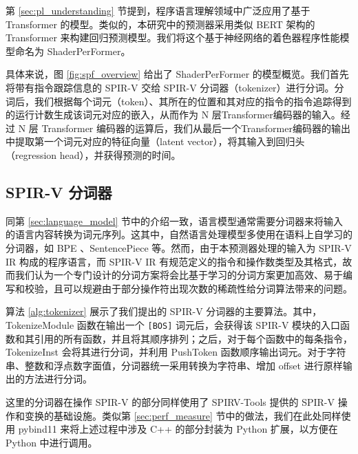 \label{sec:model}


第 \ref{sec:pl_understanding} 节提到，程序语言理解领域中广泛应用了基于 Transformer 的模型。类似的，本研究中的预测器采用类似 BERT\cite{devlin-etal-2019-bert} 架构的 Transformer 来构建回归预测模型。我们将这个基于神经网络的着色器程序性能模型命名为 ShaderPerFormer。

具体来说，图 \ref{fig:spf_overview} 给出了 ShaderPerFormer 的模型概览。我们首先将带有指令跟踪信息的 SPIR-V 交给 SPIR-V 分词器（tokenizer）进行分词。分词后，我们根据每个词元（token）、其所在的位置和其对应的指令的指令追踪得到的运行计数生成该词元对应的嵌入，从而作为 N 层Transformer编码器的输入。经过 N 层 Transformer 编码器的运算后，我们从最后一个Transformer编码器的输出中提取第一个词元对应的特征向量（latent vector），将其输入到回归头（regression head），并获得预测的时间。

\subsection{SPIR-V 分词器}

同第 \ref{sec:language_model} 节中的介绍一致，语言模型通常需要分词器来将输入的语言内容转换为词元序列。这其中，自然语言处理模型多使用在语料上自学习的分词器，如 BPE \cite{sennrich-etal-2016-neural}、SentencePiece \cite{kudo-richardson-2018-sentencepiece} 等。然而，由于本预测器处理的输入为 SPIR-V IR 构成的程序语言，而 SPIR-V IR 有规范定义的指令和操作数类型及其格式，故而我们认为一个专门设计的分词方案将会比基于学习的分词方案更加高效、易于编写和校验，且可以规避由于部分操作符出现次数的稀疏性给分词算法带来的问题。

算法 \ref{alg:tokenizer} 展示了我们提出的 SPIR-V 分词器的主要算法。其中，TokenizeModule 函数在输出一个 \verb|[BOS]| 词元后，会获得该 SPIR-V 模块的入口函数和其引用的所有函数，并且将其顺序排列；之后，对于每个函数中的每条指令，TokenizeInst 会将其进行分词，并利用 PushToken 函数顺序输出词元。对于字符串、整数和浮点数字面值，分词器统一采用转换为字符串、增加 offset 进行原样输出的方法进行分词。

这里的分词器在操作 SPIR-V 的部分同样使用了 SPIRV-Tools 提供的 SPIR-V 操作和变换的基础设施。类似第 \ref{sec:perf_measure} 节中的做法，我们在此处同样使用 pybind11 来将上述过程中涉及 C++ 的部分封装为 Python 扩展，以方便在 Python 中进行调用。

